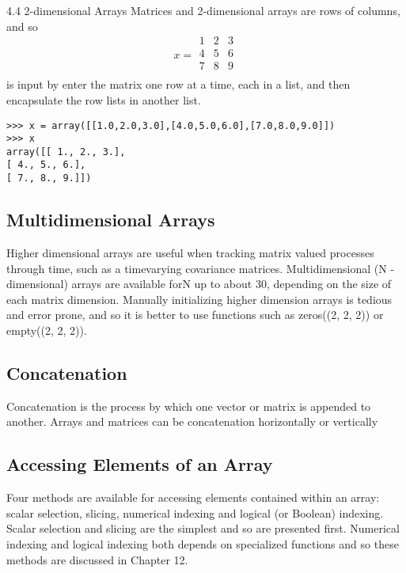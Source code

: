 \documentclass[KSmain.tex]{subfiles}
\begin{document}




\newpage

4.4 2-dimensional Arrays
Matrices and 2-dimensional arrays are rows of columns, and so
\[x =
\begin{array}{ccc}
1 & 2 & 3 \\
4 & 5 & 6 \\
7 & 8 & 9 \\
\end{array}
\]
is input by enter the matrix one row at a time, each in a list, and then encapsulate the row lists in another
list.
\begin{framed}
\begin{verbatim}
>>> x = array([[1.0,2.0,3.0],[4.0,5.0,6.0],[7.0,8.0,9.0]])
>>> x
array([[ 1., 2., 3.],
[ 4., 5., 6.],
[ 7., 8., 9.]])
\end{verbatim}
\end{framed}
\newpage
\subsection{Multidimensional Arrays}
Higher dimensional arrays are useful when tracking matrix valued processes through time, such as a timevarying
covariance matrices. Multidimensional (N -dimensional) arrays are available forN up to about 30,
depending on the size of each matrix dimension. Manually initializing higher dimension arrays is tedious
and error prone, and so it is better to use functions such as zeros((2, 2, 2)) or empty((2, 2, 2)).

\subsection{Concatenation}
Concatenation is the process by which one vector or matrix is appended to another. Arrays and matrices
can be concatenation horizontally or vertically
\subsection{ Accessing Elements of an Array }
Four methods are available for accessing elements contained within an array: scalar selection, slicing,
numerical indexing and logical (or Boolean) indexing. Scalar selection and slicing are the simplest and so
are presented first. Numerical indexing and logical indexing both depends on specialized functions and
so these methods are discussed in Chapter 12.
\newpage
\end{document}

